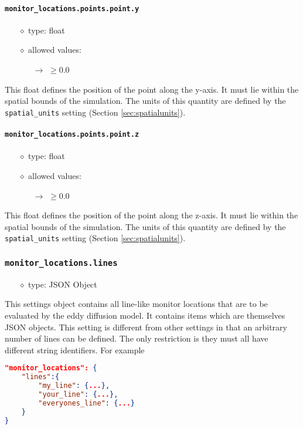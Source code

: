 \documentclass[]{article}
\def\code#1{\texttt{#1}}
\begin{document}
\paragraph{\code{monitor\_locations.points.point.y}}
\begin{itemize}
    \item[$\diamond$] type: float 
    \item[$\diamond$] allowed values:
    \begin{itemize}
        \item[$\rightarrow$] $\geq0.0$
    \end{itemize}
\end{itemize}
This float defines the position of the point along the y-axis. It must lie
within the spatial bounds of the simulation. The units of this quantity are
defined by the \code{spatial\_units} setting (Section \ref{sec:spatialunits}).

\paragraph{\code{monitor\_locations.points.point.z}}
\begin{itemize}
    \item[$\diamond$] type: float 
    \item[$\diamond$] allowed values:
    \begin{itemize}
        \item[$\rightarrow$] $\geq0.0$
    \end{itemize}
\end{itemize}
This float defines the position of the point along the z-axis. It must lie
within the spatial bounds of the simulation. The units of this quantity are
defined by the \code{spatial\_units} setting (Section \ref{sec:spatialunits}).

\subsubsection{\code{monitor\_locations.lines}}\label{sec:monlines}
\begin{itemize}
    \item[$\diamond$] type: JSON Object 
\end{itemize}
This settings object contains all line-like monitor locations that are to be
evaluated by the eddy diffusion model. It contains items which
are themselves JSON objects. This setting is different from other settings in
that an arbitrary number of lines can be defined. The only restriction is they
must all have different string identifiers. For example\\
\begin{lstlisting}[language=json,firstnumber=1]
"monitor_locations": {
    "lines":{
        "my_line": {...},
        "your_line": {...},
        "everyones_line": {...}
    }
}
\end{lstlisting}
\medskip
\end{document}
